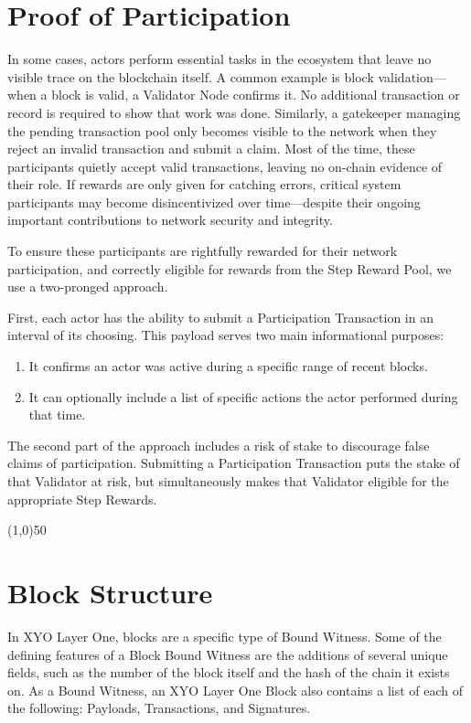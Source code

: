 \documentclass{article}
\begin{document}
\section{Proof of Participation}
In some cases, actors perform essential tasks in the ecosystem that leave no visible trace on the blockchain itself. A common example is block validation—when a block is valid, a Validator Node confirms it. No additional transaction or record is required to show that work was done. Similarly, a gatekeeper managing the pending transaction pool only becomes visible to the network when they reject an invalid transaction and submit a claim. Most of the time, these participants quietly accept valid transactions, leaving no on-chain evidence of their role. If rewards are only given for catching errors, critical system participants may become disincentivized over time—despite their ongoing important contributions to network security and integrity.

To ensure these participants are rightfully rewarded for their network participation, and correctly eligible for rewards from the Step Reward Pool, we use a two-pronged approach. 

First, each actor has the ability to submit a Participation Transaction in an interval of its choosing. This payload serves two main informational purposes:

\begin{enumerate}
    \item It confirms an actor was active during a specific range of recent blocks.
    \item It can optionally include a list of specific actions the actor performed during that time.
\end{enumerate}

The second part of the approach includes a risk of stake to discourage false claims of participation. Submitting a Participation Transaction puts the stake of that Validator at risk, but simultaneously makes that Validator eligible for the appropriate Step Rewards.

\begin{center}
    \line(1,0){50}
\end{center}
\section{Block Structure}
In XYO Layer One, blocks are a specific type of Bound Witness. Some of the defining features of a Block Bound Witness are the additions of several unique fields, such as the number of the block itself and the hash of the chain it exists on. 
As a Bound Witness, an XYO Layer One Block also contains a list of each of the following: Payloads, Transactions, and Signatures. 
\end{document}
